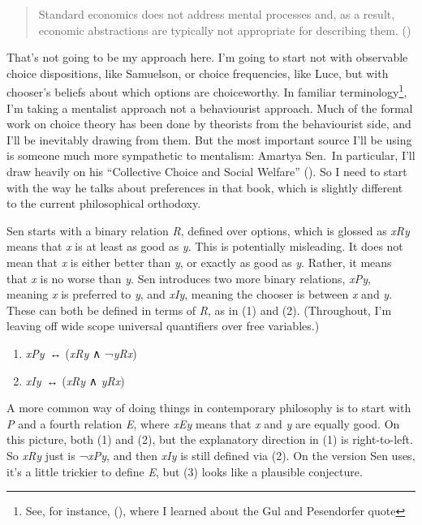 \documentclass[
  11pt,
  letterpaper,
  DIV=11,
  numbers=noendperiod,
  twoside]{scrartcl}
\providecommand{\tightlist}{%
  \setlength{\itemsep}{0pt}\setlength{\parskip}{0pt}}
\begin{document}
\begin{quote}
Standard economics does not address mental processes and, as a result,
economic abstractions are typically not appropriate for describing them.
()
\end{quote}

That's not going to be my approach here. I'm going to start not with
observable choice dispositions, like Samuelson, or choice frequencies,
like Luce, but with chooser's beliefs about which options are
choiceworthy. In familiar terminology\footnote{See, for instance,
  (), where I
  learned about the Gul and Pesendorfer quote}, I'm taking a mentalist
approach not a behaviourist approach. Much of the formal work on choice
theory has been done by theorists from the behaviourist side, and I'll
be inevitably drawing from them. But the most important source I'll be
using is someone much more sympathetic to mentalism: Amartya Sen.~In
particular, I'll draw heavily on his ``Collective Choice and Social
Welfare'' (). So I need to
start with the way he talks about preferences in that book, which is
slightly different to the current philosophical orthodoxy.

Sen starts with a binary relation \emph{R}, defined over options, which
is glossed as \emph{xRy} means that \emph{x} is at least as good as
\emph{y}. This is potentially misleading. It does not mean that \emph{x}
is either better than \emph{y}, or exactly as good as \emph{y}. Rather,
it means that \emph{x} is no worse than \emph{y}. Sen introduces two
more binary relations, \emph{xPy}, meaning \emph{x} is preferred to
\emph{y}, and \emph{xIy}, meaning the chooser is between \emph{x} and
\emph{y}. These can both be defined in terms of \emph{R}, as in (1) and
(2). (Throughout, I'm leaving off wide scope universal quantifiers over
free variables.)

\begin{enumerate}
\def\labelenumi{(\arabic{enumi})}
\tightlist
\item
  \emph{xPy}~↔︎ (\emph{xRy} ∧ ¬\emph{yRx})
\item
  \emph{xIy}~↔︎ (\emph{xRy} ∧ \emph{yRx})
\end{enumerate}

A more common way of doing things in contemporary philosophy is to start
with \emph{P} and a fourth relation \emph{E}, where \emph{xEy} means
that \emph{x} and \emph{y} are equally good. On this picture, both (1)
and (2), but the explanatory direction in (1) is right-to-left. So
\emph{xRy} just is ¬\emph{xPy}, and then \emph{xIy} is still defined via
(2). On the version Sen uses, it's a little trickier to define \emph{E},
but (3) looks like a plausible conjecture.
\end{document}
